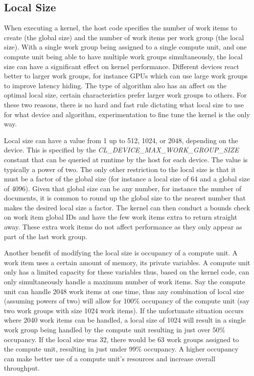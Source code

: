 \subsection{Local Size}
\label{sec:localSize}

When executing a kernel, the host code specifies the number of work items to
create (the global size) and the number of work items per work group (the local
size). With a single work group being assigned to a single compute unit, and one
compute unit being able to have multiple work groups simultaneously, the local
size can have a significant effect on kernel performance. Different devices
react better to larger work groups, for instance GPUs which can use large work
groups to improve latency hiding. The type of algorithm also has an affect on
the optimal local size, certain characteristics prefer larger work groups to
others. For these two reasons, there is no hard and fast rule dictating what
local size to use for what device and algorithm, experimentation to fine tune
the kernel is the only way.

Local size can have a value from 1 up to 512, 1024, or 2048, depending on the
device. This is specified by the \emph{CL\_DEVICE\_MAX\_WORK\_GROUP\_SIZE}
constant that can be queried at runtime by the host for each device. The value
is typically a power of two. The only other restriction to the local size is
that it must be a factor of the global size (for instance a local size of 64 and
a global size of 4096). Given that global size can be any number, for instance
the number of documents, it is common to round up the global size to the nearest
number that makes the desired local size a factor. The kernel can then conduct a
bounds check on work item global IDs and have the few work items extra to return
straight away. These extra work items do not affect performance as they only
appear as part of the last work group.

Another benefit of modifying the local size is occupancy of a compute unit. A
work item uses a certain amount of memory, its private variables. A compute unit
only has a limited capacity for these variables thus, based on the kernel code,
can only simultaneously handle a maximum number of work items. Say the compute
unit can handle 2048 work items at one time, thus any combination of local size
(assuming powers of two) will allow for 100\% occupancy of the compute unit (say
two work groups with size 1024 work items). If the unfortunate situation occurs
where 2040 work items can be handled, a local size of 1024 will result in a
single work group being handled by the compute unit resulting in just over 50\%
occupancy. If the local size was 32, there would be 63 work groups assigned to
the compute unit, resulting in just under 99\% occupancy. A higher occupancy can
make better use of a compute unit's resources and increase overall throughput.

